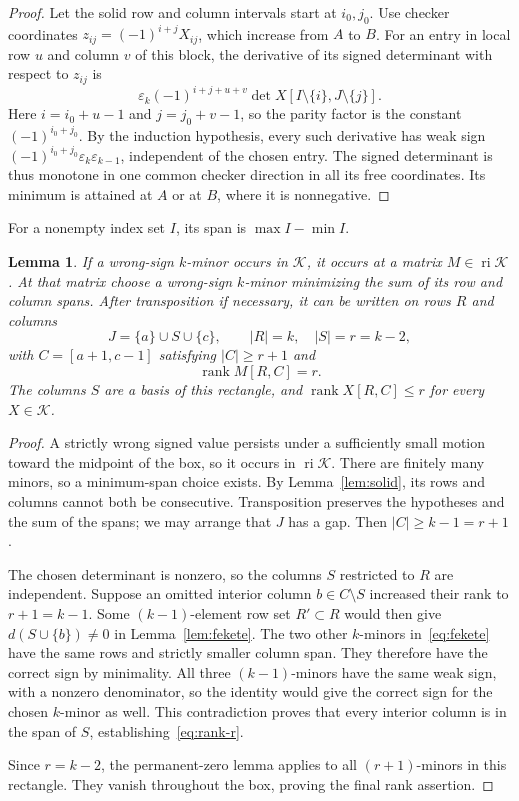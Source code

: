 \documentclass[11pt]{article}
\newtheorem{lemma}[theorem]{Lemma}
\theoremstyle{definition}
\theoremstyle{remark}
\numberwithin{equation}{section}
\newcommand{\eps}{\varepsilon}
\newcommand{\K}{\mathcal K}
\DeclareMathOperator{\rank}{rank}
\DeclareMathOperator{\ri}{ri}
\begin{document}
\begin{proof}
Let the solid row and column intervals start at $i_0,j_0$.
Use checker coordinates $z_{ij}=(-1)^{i+j}X_{ij}$, which
increase from $A$ to $B$. For an entry in local row $u$ and
column $v$ of this block, the derivative of its signed determinant
with respect to $z_{ij}$ is
\[
 \eps_k(-1)^{i+j+u+v}\det X[I\setminus\{i\},J\setminus\{j\}].
\]
Here $i=i_0+u-1$ and $j=j_0+v-1$, so the parity factor is the
constant $(-1)^{i_0+j_0}$. By the induction hypothesis, every
such derivative has weak sign
$(-1)^{i_0+j_0}\eps_k\eps_{k-1}$, independent of the chosen
entry. The signed determinant is thus monotone in one common
checker direction in all its free coordinates. Its minimum is
attained at $A$ or at $B$, where it is nonnegative.
\end{proof}

For a nonempty index set $I$, its span is $\max I-\min I$.

\begin{lemma}\label{lem:rectangle}
If a wrong-sign $k$-minor occurs in $\K$, it occurs at a matrix
$M\in\ri\K$. At that matrix choose a wrong-sign $k$-minor
minimizing the sum of its row and column spans. After transposition
if necessary, it can be written on rows $R$ and columns
\[
 J=\{a\}\cup S\cup\{c\},\qquad |R|=k,\quad |S|=r=k-2,
\]
with $C=[a+1,c-1]$ satisfying $|C|\geq r+1$ and
\begin{equation}\label{eq:rank-r}
 \rank M[R,C]=r.
\end{equation}
The columns $S$ are a basis of this rectangle, and
$\rank X[R,C]\leq r$ for every $X\in\K$.
\end{lemma}

\begin{proof}
A strictly wrong signed value persists under a sufficiently small
motion toward the midpoint of the box, so it occurs in $\ri\K$.
There are finitely many minors, so a minimum-span choice exists.
By Lemma~\ref{lem:solid}, its rows and columns cannot both be
consecutive. Transposition preserves the hypotheses and the sum
of the spans; we may arrange that $J$ has a gap. Then
$|C|\geq k-1=r+1$.

The chosen determinant is nonzero, so the columns $S$ restricted
to $R$ are independent. Suppose an omitted interior column
$b\in C\setminus S$ increased their rank to $r+1=k-1$.
Some $(k-1)$-element row set $R'\subset R$ would then give
$d(S\cup\{b\})\neq0$ in Lemma~\ref{lem:fekete}.
The two other $k$-minors in~\eqref{eq:fekete} have the same
rows and strictly smaller column span. They therefore have the
correct sign by minimality. All three $(k-1)$-minors have the
same weak sign, with a nonzero denominator, so the identity
would give the correct sign for the chosen $k$-minor as well.
This contradiction proves that every interior column is in the
span of $S$, establishing~\eqref{eq:rank-r}.

Since $r=k-2$, the permanent-zero lemma applies to all
$(r+1)$-minors in this rectangle. They vanish throughout the
box, proving the final rank assertion.
\end{proof}
\end{document}
